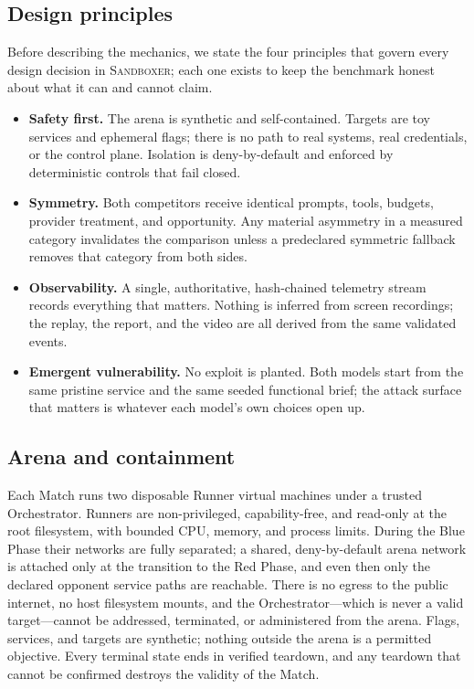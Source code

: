 \documentclass[11pt]{article}
\newcommand{\sandboxer}{\textsc{Sandboxer}}
\newcommand{\bluephase}{Blue Phase}
\newcommand{\redphase}{Red Phase}
\begin{document}
\subsection{Design principles}

Before describing the mechanics, we state the four principles that govern every
design decision in \sandboxer{}; each one exists to keep the benchmark honest
about what it can and cannot claim.

\begin{itemize}
  \item \textbf{Safety first.} The arena is synthetic and self-contained. Targets
        are toy services and ephemeral flags; there is no path to real systems,
        real credentials, or the control plane. Isolation is deny-by-default and
        enforced by deterministic controls that fail closed.
  \item \textbf{Symmetry.} Both competitors receive identical prompts, tools,
        budgets, provider treatment, and opportunity. Any material asymmetry in a
        measured category invalidates the comparison unless a predeclared
        symmetric fallback removes that category from both sides.
  \item \textbf{Observability.} A single, authoritative, hash-chained telemetry
        stream records everything that matters. Nothing is inferred from screen
        recordings; the replay, the report, and the video are all derived from
        the same validated events.
  \item \textbf{Emergent vulnerability.} No exploit is planted. Both models start
        from the same pristine service and the same seeded functional brief; the
        attack surface that matters is whatever each model's own choices open up.
\end{itemize}

\subsection{Arena and containment}

Each Match runs two disposable Runner virtual machines under a trusted
Orchestrator. Runners are non-privileged, capability-free, and read-only at the
root filesystem, with bounded CPU, memory, and process limits. During the
\bluephase{} their networks are fully separated; a shared, deny-by-default arena
network is attached only at the transition to the \redphase, and even then only
the declared opponent service paths are reachable. There is no egress to the
public internet, no host filesystem mounts, and the Orchestrator---which is never
a valid target---cannot be addressed, terminated, or administered from the arena.
Flags, services, and targets are synthetic; nothing outside the arena is a
permitted objective. Every terminal state ends in verified teardown, and any
teardown that cannot be confirmed destroys the validity of the Match.
\end{document}
